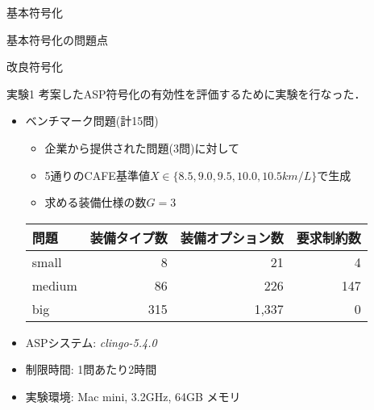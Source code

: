 \documentclass[dvipdfmx, 11pt,]{beamer}
\begin{document}
\begin{frame}{基本符号化}
  
\end{frame}
\begin{frame}{基本符号化の問題点}
 
\end{frame}
\begin{frame}{改良符号化}
  
\end{frame}
\begin{frame}{実験1}
 考案したASP符号化の有効性を評価するために実験を行なった．
 \begin{itemize}
  \item ベンチマーク問題(計15問)
	\begin{itemize}
	 \item 企業から提供された問題(3問)に対して
	 \item 5通りのCAFE基準値$X \in \{8.5, 9.0, 9.5, 10.0, 10.5km/L\}$で生成
	 \item 求める装備仕様の数$G = 3$
	\end{itemize}
	\begin{exampleblock}\small
	 \centering
	 \begin{tabular}{ l|r r r }
	  問題		& 装備タイプ数	& 装備オプション数& 要求制約数 	\\ \hline
	  small	& 8			& 21		& 4		\\
	  medium	& 86		& 226		& 147	\\
	  big		& 315		& 1,337		& 0		\\
	 \end{tabular}
	\end{exampleblock}
  \item ASPシステム: \textit{clingo-5.4.0}
  \item 制限時間: 1問あたり2時間
  \item 実験環境: Mac mini, 3.2GHz, 64GB メモリ
 \end{itemize}
\end{frame}
\end{document}
